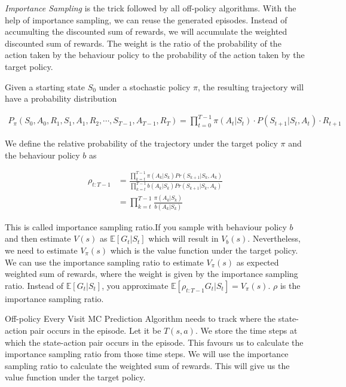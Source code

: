 \documentclass[../main.tex]{subfiles}
\begin{document}
\emph{Importance Sampling} is the trick followed by all off-policy algorithms. With the help of importance sampling, we can reuse the generated episodes. Instead of accumulting the discounted sum of rewards, we will accumulate the weighted discounted sum of rewards. The weight is the ratio of the probability of the action taken by the behaviour policy to the probability of the action taken by the target policy. 

Given a starting state $S_0$ under a stochastic policy $\pi$, the resulting trajectory will have a probability distribution

\begin{equation}
\begin{aligned}
P_{\pi}(S_0, A_0, R_1, S_1, A_1, R_2, \cdots, S_{T-1}, A_{T-1}, R_{T}) = \prod_{t=0}^{T-1} \pi(A_t|S_t) \cdot P(S_{t+1}|S_t, A_t) \cdot R_{t+1} \nonumber
\end{aligned}
\end{equation}

We define the relative probability of the trajectory under the target policy $\pi$ and the behaviour policy $b$ as

\begin{equation}
\begin{aligned}
\rho_{t:T-1} &=\frac{\prod_{k=t}^{T-1}\pi(A_k|S_k)Pr(S_{k+1}|S_k, A_k)}{\prod_{k=t}^{T-1}b(A_k|S_k)Pr(S_{k+1}|S_k, A_k)} \nonumber \\
&= \prod_{k=t}^{T-1}\frac{\pi(A_k|S_k)}{b(A_k|S_k)} \nonumber
\end{aligned}
\end{equation}

This is called importance sampling ratio.If you sample with behaviour policy $b$ and then estimate $V(s)$ as $\mathbb{E}[G_t|S_t]$ which will result in $V_b(s)$. Nevertheless, we need to estimate $V_\pi(s)$ which is the value function under the target policy. We can use the importance sampling ratio to estimate $V_\pi(s)$ as expected weighted  sum of rewards, where the weight is given by the importance sampling ratio.
Instead of $\mathbb{E}[G_t|S_t]$, you approximate $\mathbb{E}[\rho_{t:T-1} G_t | S_t] = V_\pi(s)$. $\rho$ is the importance sampling ratio.

Off-policy Every Visit MC Prediction Algorithm needs to track where the state-action pair occurs in the episode. Let it be $T(s,a)$. We store the time steps at which the state-action pair occurs in the episode. This favours us to calculate the importance sampling ratio from those time steps. We will use the importance sampling ratio to calculate the weighted sum of rewards. This will give us the value function under the target policy.
\end{document}
